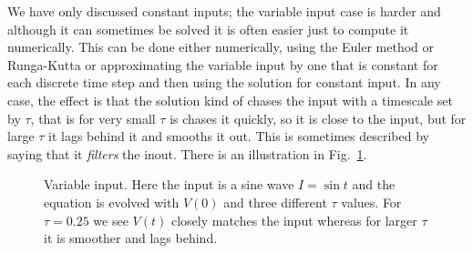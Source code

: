\documentclass[11pt,a4paper]{scrartcl}
\begin{document}
We have only discussed constant inputs; the variable input case is
harder and although it can sometimes be solved it is often easier just
to compute it numerically. This can be done either numerically, using
the Euler method or Runga-Kutta or approximating the variable input by
one that is constant for each discrete time step and then using the
solution for constant input. In any case, the effect is that the
solution kind of chases the input with a timescale set by $\tau$, that
is for very small $\tau$ is chases it quickly, so it is close to the
input, but for large $\tau$ it lags behind it and smooths it out. This
is sometimes described by saying that it \textsl{filters} the inout. There is an illustration in Fig.~\ref{chasing}.

\begin{figure}
\begin{center}

\end{center}
\caption{Variable input. Here the input is a sine wave $I=\sin{t}$ and the equation is evolved with $V(0)$ and three different $\tau$ values. For $\tau=0.25$ we see $V(t)$ closely matches the input whereas for larger $\tau$ it is smoother and lags behind.\label{chasing}}
\end{figure}
\end{document}
